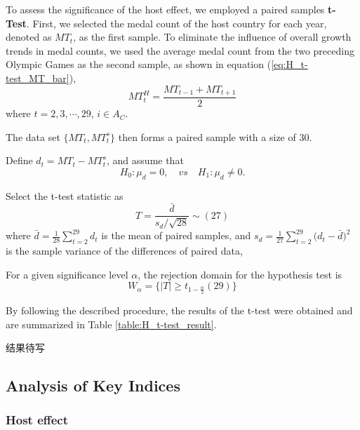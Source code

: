 \documentclass{mcmthesis}
\begin{document}
	
	To assess the significance of the host effect, we employed a paired samples  \textbf{t-Test}. First, we selected the medal count of the host country for each year, denoted as $MT_{t}$, as the first sample. To eliminate the influence of overall growth trends in medal counts, we used the average medal count from the two preceding Olympic Games as the second sample, as shown in equation (\ref{eq:H_t-test_MT_bar}),
	\begin{equation}
		MT^H_{t}=\frac{ MT_{t-1} + MT_{t+1} }{2}
		\label{eq:H_t-test_MT_bar}
	\end{equation}
	where $t=2,3,\cdots,29$, $i\in A_{C}$. 
	
	The data set $\{MT_{t},MT^s_{t}\}$ then forms a paired sample with a size of 30. 
	
	Define $d_t= MT_{t} - MT^s_{t}$, and assume that
	\begin{equation*}
		H_0: \mu_d=0, \quad vs \quad H_1:  \mu_d \ne 0.
	\end{equation*}
	
	Select the t-test statistic as
	\begin{equation}
		T=\frac{ \bar{d} }{ s_d\slash \sqrt{28} } \sim (27)
	\end{equation}
	where $\bar{d}=\frac{1}{28} \sum_{t=2}^{29} d_t$ is the mean of paired samples, 
	and $ s_d = \frac{1}{27} \sum_{t=2}^{29}\big( d_t - \bar{d} \big)^2 $ is the sample variance of the differences of paired data, 
	
	For a given significance level $\alpha$, the rejection domain for the hypothesis test is
	\begin{equation}
		W_\alpha = \big\{ |T| \ge t_{1-\frac{\alpha}{2}}(29) \big\}
	\end{equation}
	
	By following the described procedure, the results of the t-test were obtained and are summarized in Table \ref{table:H_t-test_result}.
	
	结果待写
	
	
	
	\subsection{Analysis of Key Indices}
	\subsubsection{Host effect}
	
\end{document}
